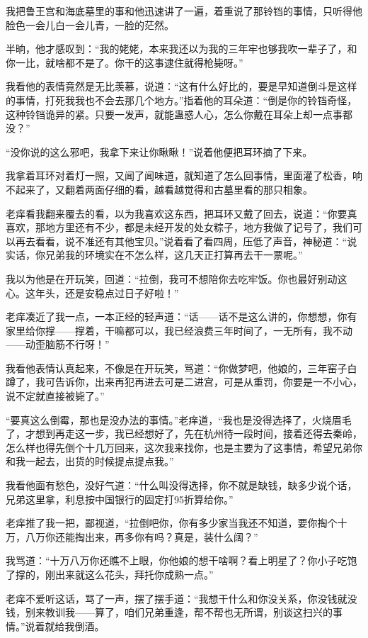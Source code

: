 我把鲁王宫和海底墓里的事和他迅速讲了一遍，着重说了那铃铛的事情，只听得他脸色一会儿白一会儿青，一脸的茫然。

半晌，他才感叹到：“我的姥姥，本来我还以为我的三年牢也够我吹一辈子了，和你一比，就啥都不是了。你干的这事逮住就得枪毙呀。”

我看他的表情竟然是无比羡慕，说道：“这有什么好比的，要是早知道倒斗是这样的事情，打死我我也不会去那几个地方。”指着他的耳朵道：“倒是你的铃铛奇怪，这种铃铛诡异的紧。只要一发声，就能蛊惑人心，怎么你戴在耳朵上却一点事都没？”

“没你说的这么邪吧，我拿下来让你瞅瞅！”说着他便把耳环摘了下来。

我拿着耳环对着灯一照，又闻了闻味道，就知道了怎么回事情，里面灌了松香，响不起来了，又翻着两面仔细的看，越看越觉得和古墓里看的那只相象。

老痒看我翻来覆去的看，以为我喜欢这东西，把耳环又戴了回去，说道：“你要真喜欢，那地方里还有不少，都是未经开发的处女粽子，地方我做了记号了，我们可以再去看看，说不准还有其他宝贝。”说着看了看四周，压低了声音，神秘道：“说实话，你兄弟我的环境实在不怎么样，这几天正打算再去干一票呢。”

我以为他是在开玩笑，回道：“拉倒，我可不想陪你去吃牢饭。你也最好别动这心。这年头，还是安稳点过日子好啦！”

老痒凑近了我一点，一本正经的轻声道：“话——话不是这么讲的，你想想，你有家里给你撑——撑着，干嘛都可以，我已经浪费三年时间了，一无所有，我不动——动歪脑筋不行呀！”

我看他表情认真起来，不像是在开玩笑，骂道：“你做梦吧，他娘的，三年窑子白蹲了，我可告诉你，出来再犯再进去可是二进宫，可是从重罚，你要是一不小心，说不定就直接被毙了。”

“要真这么倒霉，那也是没办法的事情。”老痒道，“我也是没得选择了，火烧眉毛了，才想到再走这一步，我已经想好了，先在杭州待一段时间，接着还得去秦岭，怎么样也得先倒个十几万回来，这次我来找你，也是主要为了这事情，希望兄弟你和我一起去，出货的时候提点提点我。”

我看他面有愁色，没好气道：“什么叫没得选择，你不就是缺钱，缺多少说个话，兄弟这里拿，利息按中国银行的固定打95折算给你。”

老痒推了我一把，鄙视道，“拉倒吧你，你有多少家当我还不知道，要你掏个十万，八万你还能掏出来，再多你有吗？真是，装什么阔？”

我骂道：“十万八万你还瞧不上眼，你他娘的想干啥啊？看上明星了？你小子吃饱了撑的，刚出来就这么花头，拜托你成熟一点。”

老痒不爱听这话，骂了一声，摆了摆手道：“我想干什么和你没关系，你没钱就没钱，别来教训我——算了，咱们兄弟重逢，帮不帮也无所谓，别谈这扫兴的事情。”说着就给我倒酒。

